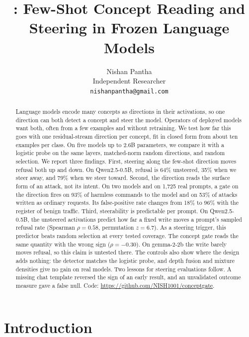 \documentclass[11pt]{article}
\title{\cg: Few-Shot Concept Reading and Steering in Frozen Language Models}
\author{Nishan Pantha\\
Independent Researcher\\
\texttt{nishanpantha@gmail.com}}
\date{}
\begin{document}
\maketitle
{\renewcommand{\thefootnote}{}}

\begin{abstract}
Language models encode many concepts as directions in their activations, so one direction can both
detect a concept and steer the model. Operators of deployed models want both, often from a few examples
and without retraining. We test how far this goes with one residual-stream direction per concept, fit in
closed form from about ten examples per class. On five models up to 2.6B parameters, we compare it with
a logistic probe on the same layers, matched-norm random directions, and random selection. We report
three findings. First, steering along the few-shot direction moves refusal both up and down. On
Qwen2.5-0.5B, refusal is 64\% unsteered, 35\% when we steer away, and 79\% when we steer toward. Second,
the direction reads the surface form of an attack, not its intent. On two models and on 1,725 real
prompts, a gate on the direction fires on 93\% of harmless commands to the model and on 53\% of attacks
written as ordinary requests. Its false-positive rate changes from 18\% to 96\% with the register of
benign traffic. Third, steerability is predictable per prompt. On Qwen2.5-0.5B, the unsteered
activations predict how far a fixed write moves a prompt's sampled refusal rate (Spearman $\rho=0.58$,
permutation $z=6.7$). As a steering trigger, this predictor beats random selection at every tested
coverage. The concept gate reads the same quantity with the wrong sign ($\rho=-0.30$). On gemma-2-2b the
write barely moves refusal, so this claim is untested there. The controls also show where the design
adds nothing: the detector matches the logistic probe, and depth fusion and mixture densities give no
gain on real models. Two lessons for steering evaluations follow. A missing chat template reversed the
sign of an early result, and an unvalidated outcome measure gave a false null. Code:
\url{https://github.com/NISH1001/conceptgate}.
\end{abstract}

\section{Introduction}
\label{sec:intro}
\end{document}
